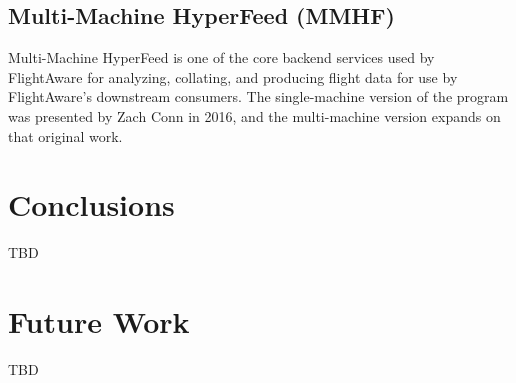 \documentclass{article}[letter,10pt]
\begin{document}
{{    \subsection{Multi-Machine HyperFeed (MMHF)}{
      Multi-Machine HyperFeed is one of the core backend services used by FlightAware for analyzing, collating, and producing
      flight data for use by FlightAware's downstream consumers. The single-machine version of the program was presented
      by Zach Conn in 2016\autocite{hyperfeed}, and the multi-machine version expands on that original work.
    }

  }

}

\section{Conclusions}{
  TBD
}

\section{Future Work}{
  TBD
}

\printbibliography
\end{document}
